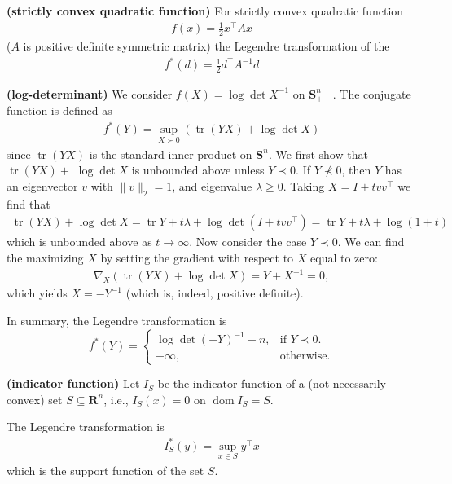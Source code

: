 \documentclass{article}
\newcommand{\bfs}[1]{\textbf{({#1}) }}
\begin{document}
\begin{exma}\bfs{strictly convex quadratic function}
For strictly convex quadratic function
\begin{align*}
f(x)=\frac{1}{2} x^{\top} A x
\end{align*}
($A$ is positive definite symmetric matrix) the Legendre transformation of the 
\begin{align*}
f^{*}(d)=\frac{1}{2} d^{\top} A^{-1} d
\end{align*}
\end{exma}
\begin{exma}\bfs{log-determinant}\label{exm:greea}
  We consider $f(X)=\log \operatorname{det} X^{-1}$ on $\mathbf{S}_{++}^{n} .$ The conjugate function is defined as
\begin{align*}
f^{*}(Y)=\sup _{X \succ 0}(\operatorname{tr}(Y X)+\log \operatorname{det} X)
\end{align*}
since $\operatorname{tr}(Y X)$ is the standard inner product on $\mathbf{S}^{n} .$ We first show that $\operatorname{tr}(Y X)+$ $\log \operatorname{det} X$ is unbounded above unless $Y \prec 0$. If $Y \nprec 0$, then $Y$ has an eigenvector $v$ with $\|v\|_{2}=1$, and eigenvalue $\lambda \geq 0$. Taking $X=I+t v v^{\top}$ we find that
\begin{align*}
\operatorname{tr}(Y X)+\log \operatorname{det} X=\operatorname{tr} Y+t \lambda+\log \operatorname{det}\left(I+t v v^{\top}\right)=\operatorname{tr} Y+t \lambda+\log (1+t)
\end{align*}
which is unbounded above as $t \rightarrow \infty$.
Now consider the case $Y \prec 0$. We can find the maximizing $X$ by setting the gradient with respect to $X$ equal to zero:
\begin{align*}
\nabla_{X}(\operatorname{tr}(Y X)+\log \operatorname{det} X)=Y+X^{-1}=0,
\end{align*}
 which yields $X=-Y^{-1}$ (which is, indeed, positive definite). 

In summary, the Legendre transformation  is 
\begin{equation}
  f^*(Y)=\begin{cases}
    \log \operatorname{det}(-Y)^{-1}-n, & \text{if $Y\prec 0$}.\\
    +\infty, & \text{otherwise}.
  \end{cases}
\end{equation}
\end{exma}
\begin{exma}\bfs{indicator function}
Let $I_{S}$ be the indicator function of a (not necessarily convex) set $S \subseteq \mathbf{R}^{n}$, i.e., $I_{S}(x)=0$ on $\operatorname{dom} I_{S}=S .$ 

The Legendre transformation  is 
\begin{align*}
I_{S}^{*}(y)=\sup _{x \in S} y^{\top} x
\end{align*}
which is the support function of the set $S$.
\end{exma} 
\end{document}

